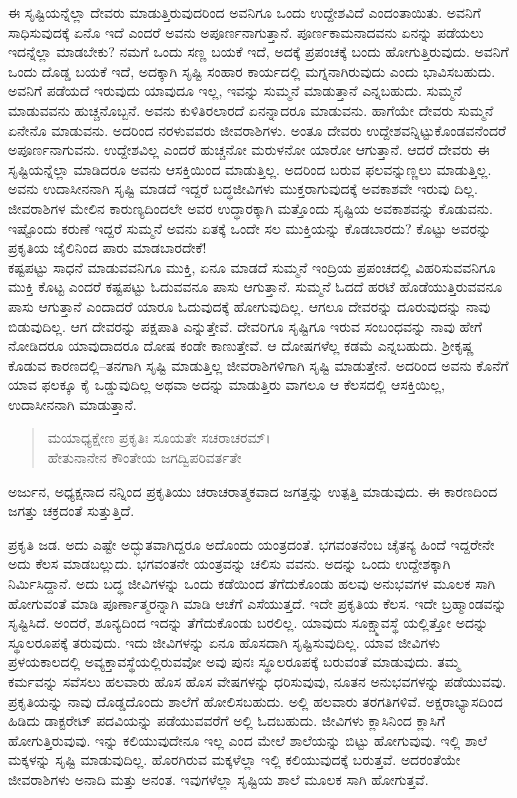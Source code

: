 ಈ ಸೃಷ್ಟಿಯನ್ನೆಲ್ಲಾ ದೇವರು ಮಾಡುತ್ತಿರುವುದರಿಂದ ಅವನಿಗೂ ಒಂದು ಉದ್ದೇಶವಿದೆ ಎಂದಂತಾಯಿತು. ಅವನಿಗೆ ಸಾಧಿಸುವುದಕ್ಕೆ ಏನೊ ಇದೆ ಎಂದರೆ ಅವನು ಅಪೂರ್ಣನಾಗುತ್ತಾನೆ. ಪೂರ್ಣಕಾಮನಾದವನು ಏನನ್ನು ಪಡೆಯಲು ಇದನ್ನೆಲ್ಲಾ ಮಾಡಬೇಕು? ನಮಗೆ ಒಂದು ಸಣ್ಣ ಬಯಕೆ ಇದೆ, ಅದಕ್ಕೆ ಪ್ರಪಂಚಕ್ಕೆ ಬಂದು ಹೋಗುತ್ತಿರುವುದು. ಅವನಿಗೆ ಒಂದು ದೊಡ್ಡ ಬಯಕೆ ಇದೆ, ಅದಕ್ಕಾಗಿ ಸೃಷ್ಟಿ ಸಂಹಾರ ಕಾರ್ಯದಲ್ಲಿ ಮಗ್ನನಾಗಿರುವುದು ಎಂದು ಭಾವಿಸಬಹುದು. ಅವನಿಗೆ ಪಡೆಯದೆ ಇರುವುದು ಯಾವುದೂ ಇಲ್ಲ, ಇವನ್ನು ಸುಮ್ಮನೆ ಮಾಡುತ್ತಾನೆ ಎನ್ನಬಹುದು. ಸುಮ್ಮನೆ ಮಾಡುವವನು ಹುಚ್ಚನೊಬ್ಬನೆ. ಅವನು ಕುಳಿತಿರಲಾರದೆ ಏನನ್ನಾದರೂ ಮಾಡುವನು. ಹಾಗೆಯೇ ದೇವರು ಸುಮ್ಮನೆ ಏನೇನೊ ಮಾಡುವನು. ಅದರಿಂದ ನರಳುವವರು ಜೀವರಾಶಿಗಳು. ಅಂತೂ ದೇವರು ಉದ್ದೇಶವನ್ನಿಟ್ಟುಕೊಂಡವನೆಂದರೆ ಅಪೂರ್ಣನಾಗುವನು. ಉದ್ದೇಶವಿಲ್ಲ ಎಂದರೆ ಹುಚ್ಚನೋ ಮರುಳನೋ ಯಾರೋ ಆಗುತ್ತಾನೆ. ಆದರೆ ದೇವರು ಈ ಸೃಷ್ಟಿಯನ್ನೆಲ್ಲಾ ಮಾಡಿದರೂ ಅವನು ಆಸಕ್ತಿಯಿಂದ ಮಾಡುತ್ತಿಲ್ಲ. ಅದರಿಂದ ಬರುವ ಫಲವನ್ನುಣ್ಣಲು ಮಾಡುತ್ತಿಲ್ಲ. ಅವನು ಉದಾಸೀನನಾಗಿ ಸೃಷ್ಟಿ ಮಾಡದೆ ಇದ್ದರೆ ಬದ್ಧಜೀವಿಗಳು ಮುಕ್ತರಾಗುವುದಕ್ಕೆ ಅವಕಾಶವೇ ಇರುವು ದಿಲ್ಲ. ಜೀವರಾಶಿಗಳ ಮೇಲಿನ ಕಾರುಣ್ಯದಿಂದಲೇ ಅವರ ಉದ್ಧಾರಕ್ಕಾಗಿ ಮತ್ತೊಂದು ಸೃಷ್ಟಿಯ ಅವಕಾಶವನ್ನು ಕೊಡುವನು. ಇಷ್ಟೊಂದು ಕರುಣೆ ಇದ್ದರೆ ಸುಮ್ಮನೆ ಅವನು ಏತಕ್ಕೆ ಒಂದೇ ಸಲ ಮುಕ್ತಿಯನ್ನು ಕೊಡಬಾರದು? ಕೊಟ್ಟು ಅವರನ್ನು ಪ್ರಕೃತಿಯ ಜೈಲಿನಿಂದ ಪಾರು ಮಾಡಬಾರದೇಕೆ!\\ಕಷ್ಟಪಟ್ಟು ಸಾಧನೆ ಮಾಡುವವನಿಗೂ ಮುಕ್ತಿ, ಏನೂ ಮಾಡದೆ ಸುಮ್ಮನೆ ಇಂದ್ರಿಯ ಪ್ರಪಂಚದಲ್ಲಿ ವಿಹರಿಸುವವನಿಗೂ ಮುಕ್ತಿ ಕೊಟ್ಟ ಎಂದರೆ ಕಷ್ಟಪಟ್ಟು ಓದುವವನೂ ಪಾಸು ಆಗುತ್ತಾನೆ. ಸುಮ್ಮನೆ ಓದದೆ ಹರಟೆ ಹೊಡೆಯುತ್ತಿರುವವನೂ ಪಾಸು ಆಗುತ್ತಾನೆ ಎಂದಾದರೆ ಯಾರೂ ಓದುವುದಕ್ಕೆ ಹೋಗುವುದಿಲ್ಲ. ಆಗಲೂ ದೇವರನ್ನು ದೂರುವುದನ್ನು ನಾವು ಬಿಡುವುದಿಲ್ಲ. ಆಗ ದೇವರನ್ನು ಪಕ್ಷಪಾತಿ ಎನ್ನುತ್ತೇವೆ. ದೇವರಿಗೂ ಸೃಷ್ಟಿಗೂ ಇರುವ ಸಂಬಂಧವನ್ನು ನಾವು ಹೇಗೆ ನೋಡಿದರೂ ಯಾವುದಾದರೂ ದೋಷ ಕಂಡೇ ಕಾಣುತ್ತೇವೆ. ಆ ದೋಷಗಳೆಲ್ಲ ಕಡಮೆ ಎನ್ನಬಹುದು. ಶ‍್ರೀಕೃಷ್ಣ ಕೊಡುವ ಕಾರಣದಲ್ಲಿ–ತನಗಾಗಿ ಸೃಷ್ಟಿ ಮಾಡುತ್ತಿಲ್ಲ ಜೀವರಾಶಿಗಳಿಗಾಗಿ ಸೃಷ್ಟಿ ಮಾಡುತ್ತೇನೆ. ಅದರಿಂದ ಅವನು ಕೊನೆಗೆ ಯಾವ ಫಲಕ್ಕೂ ಕೈ ಒಡ್ಡುವುದಿಲ್ಲ ಅಥವಾ ಅದನ್ನು ಮಾಡುತ್ತಿರು ವಾಗಲೂ ಆ ಕೆಲಸದಲ್ಲಿ ಆಸಕ್ತಿಯಿಲ್ಲ, ಉದಾಸೀನನಾಗಿ ಮಾಡುತ್ತಾನೆ.

\begin{verse}
ಮಯಾಧ್ಯಕ್ಷೇಣ ಪ್ರಕೃತಿಃ ಸೂಯತೇ ಸಚರಾಚರಮ್​।\\ಹೇತುನಾನೇನ ಕೌಂತೇಯ ಜಗದ್ವಿಪರಿವರ್ತತೇ 
\end{verse}

{\small ಅರ್ಜುನ, ಅಧ್ಯಕ್ಷನಾದ ನನ್ನಿಂದ ಪ್ರಕೃತಿಯು ಚರಾಚರಾತ್ಮಕವಾದ ಜಗತ್ತನ್ನು ಉತ್ಪತ್ತಿ ಮಾಡುವುದು. ಈ ಕಾರಣದಿಂದ ಜಗತ್ತು ಚಕ್ರದಂತೆ ಸುತ್ತುತ್ತಿದೆ.}

ಪ್ರಕೃತಿ ಜಡ. ಅದು ಎಷ್ಟೇ ಅದ್ಭುತವಾಗಿದ್ದರೂ ಅದೊಂದು ಯಂತ್ರದಂತೆ. ಭಗವಂತನೆಂಬ ಚೈತನ್ಯ ಹಿಂದೆ ಇದ್ದರೇನೇ ಅದು ಕೆಲಸ ಮಾಡಬಲ್ಲುದು. ಭಗವಂತನೇ ಯಂತ್ರವನ್ನು ಚಲಿಸು ವವನು. ಅದನ್ನು ಒಂದು ಉದ್ದೇಶಕ್ಕಾಗಿ ನಿರ್ಮಿಸಿದ್ದಾನೆ. ಅದು ಬದ್ಧ ಜೀವಿಗಳನ್ನು ಒಂದು ಕಡೆಯಿಂದ ತೆಗೆದುಕೊಂಡು ಹಲವು ಅನುಭವಗಳ ಮೂಲಕ ಸಾಗಿ ಹೋಗುವಂತೆ ಮಾಡಿ ಪೂರ್ಣಾತ್ಮರನ್ನಾಗಿ ಮಾಡಿ ಆಚೆಗೆ ಎಸೆಯುತ್ತದೆ. ಇದೇ ಪ್ರಕೃತಿಯ ಕೆಲಸ. ಇದೇ ಬ್ರಹ್ಮಾಂಡವನ್ನು ಸೃಷ್ಟಿಸಿದೆ. ಅಂದರೆ, ಶೂನ್ಯದಿಂದ ಇದನ್ನು ತೆಗೆದುಕೊಂಡು ಬರಲಿಲ್ಲ. ಯಾವುದು ಸೂಕ್ಷ್ಮಾವಸ್ಥೆ ಯಲ್ಲಿತ್ತೋ ಅದನ್ನು ಸ್ಥೂಲರೂಪಕ್ಕೆ ತರುವುದು. ಇದು ಜೀವಿಗಳನ್ನು ಏನೂ ಹೊಸದಾಗಿ ಸೃಷ್ಟಿಸುವುದಿಲ್ಲ. ಯಾವ ಜೀವಿಗಳು ಪ್ರಳಯಕಾಲದಲ್ಲಿ ಅವ್ಯಕ್ತಾವಸ್ಥೆಯಲ್ಲಿರುವವೋ ಅವು ಪುನಃ ಸ್ಥೂಲರೂಪಕ್ಕೆ ಬರುವಂತೆ ಮಾಡುವುದು. ತಮ್ಮ ಕರ್ಮವನ್ನು ಸವೆಸಲು ಹಲವಾರು ಹೊಸ ಹೊಸ ವೇಷಗಳನ್ನು ಧರಿಸುವುವು, ನೂತನ ಅನುಭವಗಳನ್ನು ಪಡೆಯುವವು. ಪ್ರಕೃತಿಯನ್ನು ನಾವು ದೊಡ್ಡದೊಂದು ಶಾಲೆಗೆ ಹೋಲಿಸಬಹುದು. ಅಲ್ಲಿ ಹಲವಾರು ತರಗತಿಗಳಿವೆ. ಅಕ್ಷರಾಭ್ಯಾಸದಿಂದ ಹಿಡಿದು ಡಾಕ್ಟರೇಟ್ ಪದವಿಯನ್ನು ಪಡೆಯುವವರೆಗೆ ಅಲ್ಲಿ ಓದಬಹುದು. ಜೀವಿಗಳು ಕ್ಲಾಸಿನಿಂದ ಕ್ಲಾಸಿಗೆ ಹೋಗುತ್ತಿರುವುವು. ಇನ್ನು ಕಲಿಯುವುದೇನೂ ಇಲ್ಲ ಎಂದ ಮೇಲೆ ಶಾಲೆಯನ್ನು ಬಿಟ್ಟು ಹೋಗುವುವು. ಇಲ್ಲಿ ಶಾಲೆ ಮಕ್ಕಳನ್ನು ಸೃಷ್ಟಿ ಮಾಡುವುದಿಲ್ಲ. ಹೊರಗಿರುವ ಮಕ್ಕಳೆಲ್ಲಾ ಇಲ್ಲಿ ಕಲಿಯುವುದಕ್ಕೆ ಬರುತ್ತವೆ. ಅದರಂತೆಯೇ ಜೀವರಾಶಿಗಳು ಅನಾದಿ ಮತ್ತು ಅನಂತ. ಇವುಗಳೆಲ್ಲಾ ಸೃಷ್ಟಿಯ ಶಾಲೆ ಮೂಲಕ ಸಾಗಿ ಹೋಗುತ್ತವೆ.

